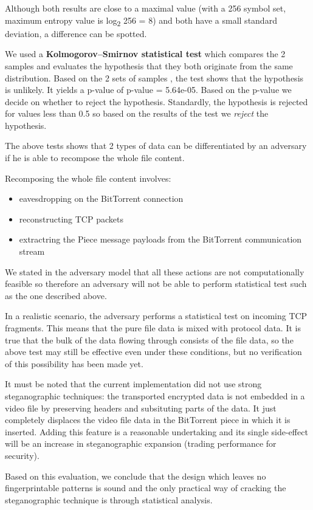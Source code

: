 \documentclass[11pt]{book} %
\begin{document}
Although both results are close to a maximal value (with a 256 symbol set, maximum entropy value is log\textsubscript{2} 256 = 8) and both have a small standard deviation, a difference can be spotted.

We used a \textbf{Kolmogorov–Smirnov statistical test} which compares the 2 samples and evaluates the hypothesis that they both originate from the same distribution. Based on the 2 sets of samples , the test shows that the hypothesis is unlikely. It yields a p-value of  p-value = 5.64e-05. Based on the p-value we decide on whether to reject the hypothesis. Standardly, the hypothesis is rejected for values less than 0.5 so based on the results of the test we \textit{reject} the hypothesis.

The above tests shows that 2 types of data can be differentiated by an adversary if he is able to recompose the whole file content.

Recomposing the whole file content involves:
\begin{itemize}
\item eavesdropping on the BitTorrent connection
\item reconstructing TCP packets
\item extractring the Piece message payloads from the BitTorrent communication stream
\end{itemize}

We stated in the adversary model that all these actions are not computationally feasible so therefore an adversary will not be able to perform statistical test such as the one described above.

In a realistic scenario, the adversary performs a statistical test on incoming TCP fragments. This means that the pure file data is mixed with protocol data. It is true that the bulk of the data flowing through consists of the file data, so the above test may still be effective even under these conditions, but no verification of this possibility has been made yet.

It must be noted that the current implementation did not use strong steganographic techniques: the transported encrypted data is not embedded in a video file by preserving headers and subsituting parts of the data. It just completely displaces the video file data in the BitTorrent piece in which it is inserted. Adding this feature is a reasonable undertaking and its single side-effect will be an increase in steganographic expansion (trading performance for security).

Based on this evaluation, we conclude that the design which leaves no fingerprintable patterns is sound and the only practical way of cracking the steganographic technique is through statistical analysis.
\end{document}
